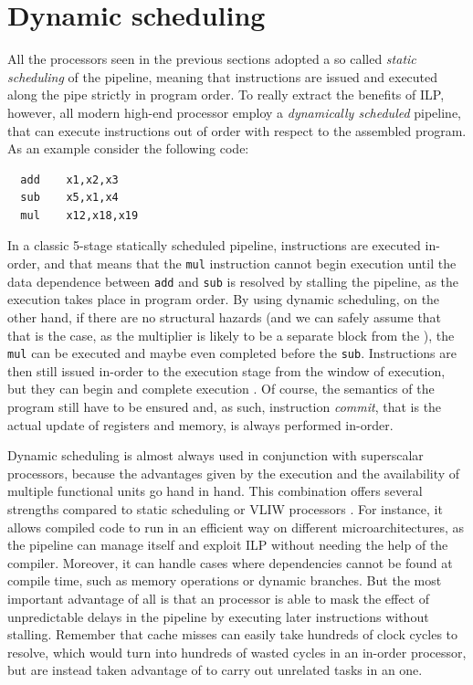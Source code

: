 \section{Dynamic scheduling}
All the processors seen in the previous sections adopted a so called \emph{static scheduling} of the pipeline, meaning that instructions are issued and executed along the pipe strictly in program order. To really extract the benefits of \ac{ILP}, however, all modern high-end processor employ a \emph{dynamically scheduled} pipeline, that can execute instructions out of order with respect to the assembled program. As an example consider the following code:
\begin{verbatim}
  add    x1,x2,x3
  sub    x5,x1,x4
  mul    x12,x18,x19
\end{verbatim}
In a classic 5-stage statically scheduled pipeline, instructions are executed in-order, and that means that the \texttt{mul} instruction cannot begin execution until the data dependence between \texttt{add} and \texttt{sub} is resolved by stalling the pipeline, as the execution takes place in program order. By using dynamic scheduling, on the other hand, if there are no structural hazards (and we can safely assume that that is the case, as the multiplier is likely to be a separate block from the ), the \texttt{mul} can be executed and maybe even completed before the \texttt{sub}. Instructions are then still issued in-order to the execution stage from the window of execution, but they can begin and complete execution \ooo. Of course, the semantics of the program still have to be ensured and, as such, instruction \emph{commit}, that is the actual update of registers and memory, is always performed in-order.

Dynamic scheduling is almost always used in conjunction with superscalar processors, because the advantages given by the \ooo execution and the availability of multiple functional units go hand in hand. This combination offers several strengths compared to static scheduling or \ac{VLIW} processors \cite[p.~192]{hennessy17}. For instance, it allows compiled code to run in an efficient way on different microarchitectures, as the pipeline can manage itself and exploit \ac{ILP} without needing the help of the compiler. Moreover, it can handle cases where dependencies cannot be found at compile time, such as memory operations or dynamic branches. But the most important advantage of all is that an \ooo processor is able to mask the effect of unpredictable delays in the pipeline by executing later instructions without stalling. Remember that cache misses can easily take hundreds of clock cycles to resolve, which would turn into hundreds of wasted cycles in an in-order processor, but are instead taken advantage of to carry out unrelated tasks in an \ooo one.

